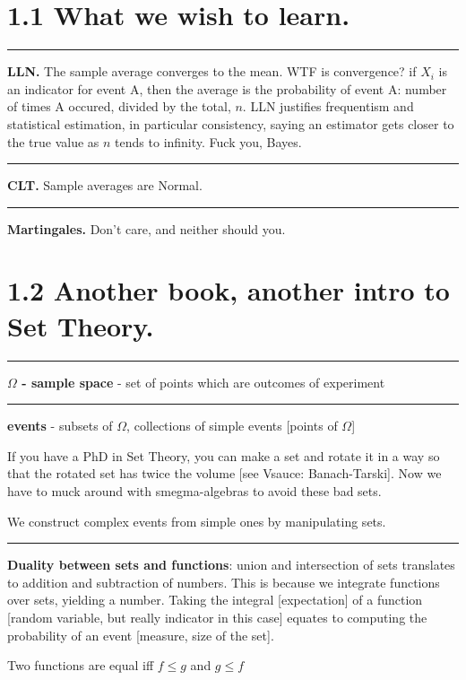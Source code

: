 \documentclass{article}
\begin{document}
\begin{flushleft}
\section*{1.1 What we wish to learn.}

\bigbreak
\hrule
\bigbreak
\textbf{LLN.} The sample average converges to the mean. WTF is convergence? if $X_i$ is an indicator for event A, then the average is the probability of event A: number of times A occured, divided by the total, $n$. LLN justifies frequentism and statistical estimation, in particular consistency, saying an estimator gets closer to the true value as $n$ tends to infinity. Fuck you, Bayes.

\bigbreak
\hrule
\bigbreak
\textbf{CLT.} Sample averages are Normal.

\bigbreak
\hrule
\bigbreak
\textbf{Martingales.} Don't care, and neither should you.

\bigbreak

\section*{1.2 Another book, another intro to Set Theory.}

\bigbreak
\hrule
\bigbreak
\textbf{$\Omega$ - sample space} - set of points which are outcomes of experiment

\bigbreak
\hrule
\bigbreak
\textbf{events} - subsets of $\Omega$, collections of simple events [points of $\Omega$]

\bigbreak

If you have a PhD in Set Theory, you can make a set and rotate it in a way so that the rotated set has twice the volume [see Vsauce: Banach-Tarski]. Now we have to muck around with smegma-algebras to avoid these bad sets. 

\bigbreak

We construct complex events from simple ones by manipulating sets. 

\bigbreak
\hrule
\bigbreak
\textbf{Duality between sets and functions}: union and intersection of sets translates to addition and subtraction of numbers. This is because we integrate functions over sets, yielding a number. Taking the integral [expectation] of a function [random variable, but really indicator in this case] equates to computing the probability of an event [measure, size of the set].

\bigbreak

Two functions are equal iff $f \leq g$ and $g \leq f$


\end{flushleft}
\end{document}
